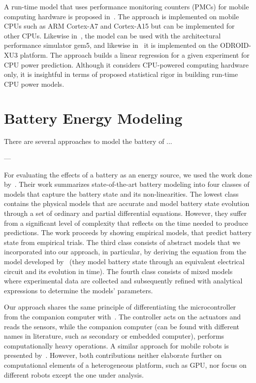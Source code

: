 A run-time model that uses performance monitoring counters (PMCs) for mobile computing hardware is proposed in~\citep{walker2017accurate}. The approach is implemented on mobile CPUs such as ARM Cortex-A7 and Cortex-A15 but can be implemented for other CPUs. Likewise in~\citep{reddy2017empirical}, the model can be used with the architectural performance simulator gem5, and likewise in~\citep{nunez2013enabling,nikov2015evaluation,reddy2017empirical} it is implemented on the ODROID-XU3 platform. The approach builds a linear regression for a given experiment for CPU power prediction. Although it considers CPU-powered computing hardware only, it is insightful in terms of proposed statistical rigor in building run-time CPU power models.

\section{Battery Energy Modeling}

There are several approaches to model the battery of ... 

---


For evaluating the effects of a battery as an energy source, we used the work done by~\citep{rao2003battery}. Their work summarizes state-of-the-art battery modeling into four classes of models that capture the battery state and its non-linearities. The lowest class contains the physical models that are accurate and model battery state evolution through a set of ordinary and partial differential equations. However, they suffer from a significant level of complexity that reflects on the time needed to produce predictions. The work proceeds by showing empirical models, that predict battery state from empirical trials. The third class consists of abstract models that we incorporated into our approach, in particular, by deriving the equation from the model developed by~\citep{hasan2018exogenous} (they model battery state through an equivalent electrical circuit and its evolution in time). The fourth class consists of mixed models where experimental data are collected and subsequently refined with analytical expressions to determine the models' parameters.


Our approach shares the same principle of differentiating the microcontroller from the companion computer with~\citep{mei2004energy, mei2005case}. The controller acts on the actuators and reads the sensors, while the companion computer (can be found with different names in literature, such as secondary or embedded computer), performs computationally heavy operations. A similar approach for mobile robots is presented by~\citep{dressler2005energy}. However, both contributions neither elaborate further on computational elements of a heterogeneous platform, such as GPU, nor focus on different robots except the one under analysis.

